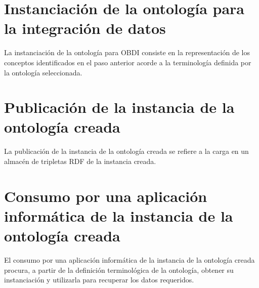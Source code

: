 \section{Instanciación de la ontología para la integración de datos}

La instanciación de la ontología para OBDI consiste en la representación de los conceptos identificados en el paso anterior acorde a la terminología definida por la ontología seleccionada. 



\section{Publicación de la instancia de la ontología creada}

La publicación de la instancia de la ontología creada se refiere a la carga en un almacén de tripletas RDF de la instancia creada.

\section{Consumo por una aplicación informática de la instancia de la ontología creada}

El consumo por una aplicación informática de la instancia de la ontología creada procura, a partir de la definición terminológica de la ontología, obtener su instanciación y utilizarla para recuperar los datos requeridos.







